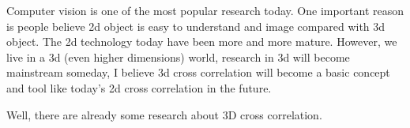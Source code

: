 Computer vision is one of the most popular research today. One important reason is people believe 2d object is easy to understand and image compared with 3d object. The 2d technology today have been more and more mature. However, we live in a 3d (even higher dimensions) world, research in 3d will become mainstream someday, I believe 3d cross correlation will become a basic concept and tool like today's 2d cross correlation in the future. 

Well, there are already some research about 3D cross correlation\cite{Li2002Auto}\cite{article2013}.